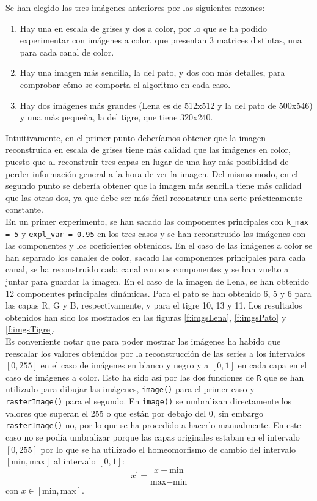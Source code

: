 Se han elegido las tres imágenes anteriores por las siguientes razones:
\begin{enumerate}
\item Hay una en escala de grises y dos a color, por lo que se ha podido experimentar con imágenes a color, que presentan 3 matrices distintas, una para cada canal de color.
\item Hay una imagen más sencilla, la del pato, y dos con más detalles, para comprobar cómo se comporta el algoritmo en cada caso.
\item Hay dos imágenes más grandes (Lena es de 512x512 y la del pato de 500x546) y una más pequeña, la del tigre, que tiene 320x240.
\end{enumerate}

Intuitivamente, en el primer punto deberíamos obtener que la imagen reconstruida en escala de grises tiene más calidad que las imágenes en color, puesto que al reconstruir tres capas en lugar de una hay más posibilidad de perder información general a la hora de ver la imagen. Del mismo modo, en el segundo punto se debería obtener que la imagen más sencilla tiene más calidad que las otras dos, ya que debe ser más fácil reconstruir una serie prácticamente constante.\\ 

En un primer experimento, se han sacado las componentes principales con \texttt{k\_max = 5} y \texttt{expl\_var = 0.95} en los tres casos y se han reconstruido las imágenes con las componentes y los coeficientes obtenidos. En el caso de las imágenes a color se han separado los canales de color, sacado las componentes principales para cada canal, se ha reconstruido cada canal con sus componentes y se han vuelto a juntar para guardar la imagen. En el caso de la imagen de Lena, se han obtenido 12 componentes principales dinámicas. Para el pato se han obtenido 6, 5 y 6 para las capas R, G y B, respectivamente, y para el tigre 10, 13 y 11. Los resultados obtenidos han sido los mostrados en las figuras \ref{f:imgsLena}, \ref{f:imgsPato} y \ref{f:imgsTigre}.\\

Es conveniente notar que para poder mostrar las imágenes ha habido que reescalar los valores obtenidos por la reconstrucción de las series a los intervalos $[0,255]$ en el caso de imágenes en blanco y negro y a $[0,1]$ en cada capa en el caso de imágenes a color. Esto ha sido así por las dos funciones de \texttt{R} que se han utilizado para dibujar las imágenes, \texttt{image()} para el primer caso y \texttt{rasterImage()} para el segundo. En \texttt{image()} se umbralizan directamente los valores que superan el 255 o que están por debajo del 0, sin embargo \texttt{rasterImage()} no, por lo que se ha procedido a hacerlo manualmente. En este caso no se podía umbralizar porque las capas originales estaban en el intervalo $[0,255]$ por lo que se ha utilizado el homeomorfismo de cambio del intervalo $[\text{min},\text{max}]$ al intervalo $[0,1]$:
\[	x^{'} = \frac{x - \text{min}}{\text{max}-\text{min}} 	\]
con $x \in [\text{min},\text{max}]$.

